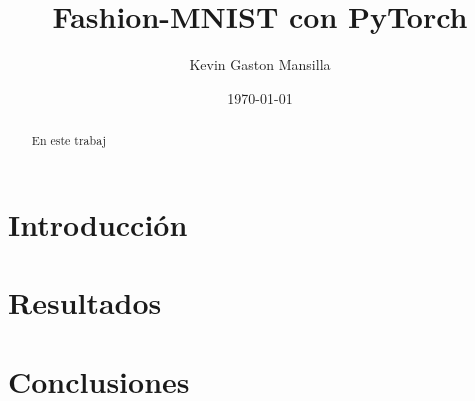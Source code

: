 \documentclass[aps,prl,reprint,groupedaddress]{revtex4-2}
\begin{document}
\title{
Fashion-MNIST con PyTorch
}

\author{Kevin Gaston Mansilla}

\affiliation{}

\date{\today}

\begin{abstract}
En este trabaj
\end{abstract}


\maketitle

\section{Introducción}


\section{Resultados}



\section{Conclusiones}




\end{document}
